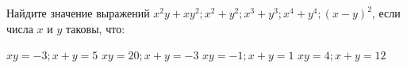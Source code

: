 \begin{consultation}
	\begin{listofex}
		\item Найдите значение выражений \(x^2y+xy^2; x^2 + y^2; x^3 + y^3; x^4 + y^4; (x-y)^2\), если числа \(x\) и \(y\) таковы, что:
		\begin{itasks}[2]
			\task \(xy=-3; x+y=5\)
			\task \(xy=20; x+y=-3\)
			\task \(xy=-1; x+y=1\)
			\task \(xy=4; x+y=12\)
		\end{itasks}



\end{listofex}
\end{consultation}
